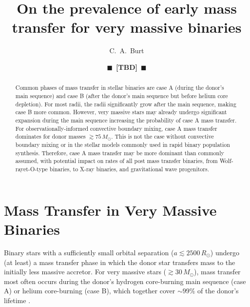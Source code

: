 \documentclass[twocolumn]{aastex63}
\newcommand{\todo}[1]{{\large $\blacksquare$~\textbf{\color{red}[#1]}}~$\blacksquare$}
\begin{document}
\title{On the prevalence of early mass transfer for very massive binaries}

\author[0009-0008-2061-4946]{C.~A.~Burt}
\author{\todo{TBD}}


\begin{abstract}
  Common phases of mass transfer in stellar binaries are case A
  (during the donor's main sequence) and case B (after the donor's
  main sequence but before helium core depletion). For most radii, the
  radii significantly grow after the main sequence, making case B more
  common. However, very massive stars may already undergo significant
  expansion during the main sequence increasing the probability of
  case A mass transfer.  For observationally-informed convective
  boundary mixing, case A mass transfer dominates for donor masses
  $\gtrsim 75 \, M_{\odot}$. This is not the case without convective
  boundary mixing or in the stellar models commonly used in rapid
  binary population synthesis.  Therefore, case A mass transfer may be
  more dominant than commonly assumed, with potential impact on rates
  of all post mass transfer binaries, from Wolf-rayet-O-type binaries,
  to X-ray binaries, and gravitational wave progenitors.
\end{abstract}

\section{Mass Transfer in Very Massive Binaries}

Binary stars with a sufficiently small orbital separation
($a\lesssim2500\,R_{\odot}$) undergo (at least) a mass transfer phase
in which the donor star transfers mass to the initially less massive
accretor. For very massive stars ($ \gtrsim 30 \, M_{\odot}$), mass
transfer most often occurs during the donor's hydrogen core-burning
main sequence (case A) or helium core-burning (case B), which together cover
$\sim99\%$ of the donor's lifetime \citep{kippenhahn:67}.
\end{document}
